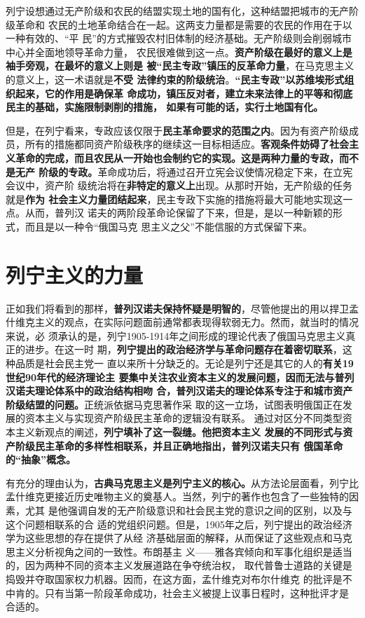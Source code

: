 列宁设想通过无产阶级和农民的结盟实现土地的国有化，这种结盟把城市的无产阶级革命和
农民的土地革命结合在一起。这两支力量都是需要的农民的作用在于以一种有效的、“平
民”的方式摧毁农村旧体制的经济基础。无产阶级则会削弱城市中心并全面地领导革命力量，
农民很难做到这一点。\textbf{资产阶级在最好的意义上是袖手旁观，在最坏的意义上则是
  被“民主专政”镇压的反革命力量}，在马克思主义的意义上，这一术语就是\textbf{不受
  法律约束的阶级统治}。\textbf{“民主专政”以苏维埃形式组织起来，它的作用是确保革
  命成功，镇压反对者，建立未来法律上的平等和彻底民主的基础，实施限制剥削的措施，
  如果有可能的话，实行土地国有化。}

但是，在列宁看来，专政应该仅限于\textbf{民主革命要求的范围之内}。因为有资产阶级成
员，所有的措施都同资产阶级秩序的继续这一目标相适应。\textbf{客观条件妨碍了社会主
  义革命的完成，而且农民从一开始也会制约它的实现。这是两种力量的专政，而不是无产
  阶级的专政。}革命成功后，将通过召开立宪会议使情况稳定下来，在立宪会议中，资产阶
级统治将在\textbf{非特定的意义上}出现。从那时开始，无产阶级的任务就是\textbf{作为
  社会主义力量团结起来}，民主专政下实施的措施将最大可能地实现这一点。从而，普列汉
诺夫的两阶段革命论保留了下来，但是，是以一种新颖的形式，而且是以一种令“俄国马克
思主义之父”不能信服的方式保留下来。

\section{列宁主义的力量}

正如我们将看到的那样，\textbf{普列汉诺夫保持怀疑是明智的}，尽管他提出的用以捍卫孟
什维克主义的观点，在实际问题面前通常都表现得软弱无力。然而，就当时的情况来说，必
须承认的是，列宁1905-1914年之间形成的理论代表了俄国马克思主义真正的进步。在这一时
期，\textbf{列宁提出的政治经济学与革命问题存在着密切联系}，这种品质是社会民主党一
直以来所十分缺乏的。无论是列宁还是其它的人的\textbf{有关19世纪90年代的经济理论主
  要集中关注农业资本主义的发展问题，因而无法与普列汉诺夫理论体系中的政治结构相吻
  合，普列汉诺夫的理论体系专注于和城市资产阶级结盟的问题。}正统派依据马克思著作采
取的这一立场，试图表明俄国正在发展的资本主义与实现资产阶级民主革命的逻辑没有联系。
通过对区分不同类型资本主义新观点的阐述，\textbf{列宁填补了这一裂缝。他把资本主义
  发展的不同形式与资产阶级民主革命的多样性相联系，并且正确地指出，普列汉诺夫只有
  俄国革命的“抽象”概念。}

有充分的理由认为，\textbf{古典马克思主义是列宁主义的核心。}从方法论层面看，列宁比
孟什维克更接近历史唯物主义的奠基人。当然，列宁的著作也包含了一些独特的因素，尤其
是他强调自发的无产阶级意识和社会民主党的意识之间的区别，以及与这个问题相联系的合
适的党组织问题。但是，1905年之后，列宁提出的政治经济学为这些思想的存在提供了从经
济基础层面的解释，从而保证了这些观点和马克思主义分析视角之间的一致性。布朗基主
义——雅各宾倾向和军事化组织是适当的，因为两种不同的资本主义发展道路在争夺统治权，
取代普鲁士道路的关键是捣毁并夺取国家权力机器。因而，在这方面，孟什维克对布尔什维克
的批评是不中肯的。只有当第一阶段革命成功，社会主义被提上议事日程时，这种批评才是
合适的。


